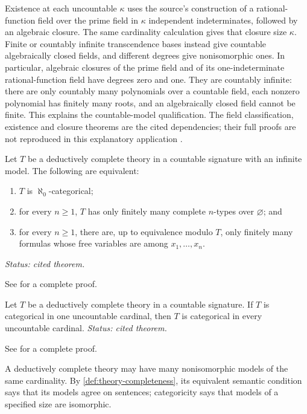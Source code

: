 Existence at each uncountable \(\kappa\) uses the source's construction
of a rational-function field over the prime field in \(\kappa\)
independent indeterminates, followed by an algebraic closure.  The same
cardinality calculation gives that closure size \(\kappa\).
Finite or countably infinite transcendence bases instead give countable
algebraically closed fields, and different degrees give nonisomorphic
ones.  In particular, algebraic closures of the prime field and of its
one-indeterminate rational-function field have degrees zero and one.
They are countably infinite: there are only countably many polynomials
over a countable field, each nonzero polynomial has finitely many roots,
and an algebraically closed field cannot be finite.  This explains the
countable-model qualification.  The field classification, existence and
closure theorems are the cited dependencies; their full proofs are not
reproduced in this explanatory application
\cite[\S\S21--24, especially pp.~287--289 and 300--301]{Steinitz1910}.

\begin{theorem}
Let \(T\) be a deductively complete theory in a countable signature with an infinite
model.  The following are equivalent:
\begin{enumerate}
  \item \(T\) is \(\aleph_0\)-categorical;
  \item for every \(n\geq1\), \(T\) has only finitely many complete
        \(n\)-types over \(\varnothing\); and
  \item for every \(n\geq1\), there are, up to equivalence modulo
        \(T\), only finitely many formulas whose free variables are among
        \(x_1,\ldots,x_n\).
\end{enumerate}
\textit{Status: cited theorem.}
\end{theorem}

See \cite{Hodges1993} for a complete proof.

\begin{theorem}
Let \(T\) be a deductively complete theory in a countable signature.  If \(T\) is
categorical in one uncountable cardinal, then \(T\) is categorical in every
uncountable cardinal.
\textit{Status: cited theorem.}
\end{theorem}

See \cite{Marker2002} for a complete proof.

\begin{warning}
A deductively complete theory may have many nonisomorphic models of the same
cardinality.  By \cref{def:theory-completeness}, its equivalent semantic
condition says that its models agree on sentences; categoricity says that
models of a specified size are isomorphic.
\end{warning}
